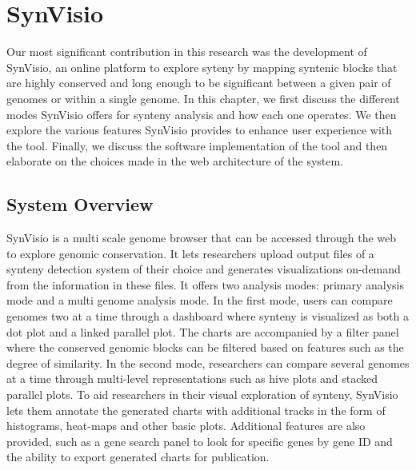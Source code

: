 \chapter{SynVisio}

Our most significant contribution in this research was the development of SynVisio, an online platform to explore syteny by mapping syntenic blocks that are highly conserved and long enough to be significant between a given pair of genomes or within a single genome. In this chapter, we first discuss the different modes SynVisio offers for synteny analysis and how each one operates. We then explore the various features SynVisio provides to enhance user experience with the tool. Finally, we discuss the software implementation of the tool and then elaborate on the choices made in the web architecture of the system.

\section{System Overview}
SynVisio is a multi scale genome browser that can be accessed through the web to explore genomic conservation. It lets researchers upload output files of a synteny detection system of their choice and generates visualizations on-demand from the information in these files. It offers two analysis modes: primary analysis mode and a multi genome analysis mode. In the first mode, users can compare genomes two at a time through a dashboard where synteny is visualized as both a dot plot and a linked parallel plot. The charts are accompanied by a filter panel where the conserved genomic blocks can be filtered based on features such as the degree of similarity. In the second mode, researchers can compare several genomes at a time through multi-level representations such as hive plots and stacked parallel plots. To aid researchers in their visual exploration of synteny, SynVisio lets them annotate the generated charts with additional tracks in the form of histograms, heat-maps and other basic plots. Additional features are also provided, such as a gene search panel to look for specific genes by gene ID and the ability to export generated charts for publication.


